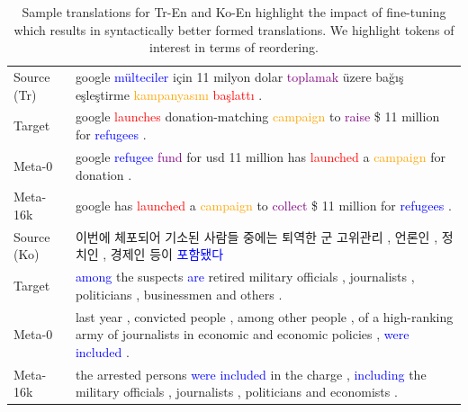 \begin{table}[tb]
\centering
\small
\begin{tabular}{p{}|p{}}
\toprule
Source (Tr) & google \textcolor{blue}{mülteciler} için 11 milyon dolar \textcolor{purple}{toplamak} üzere bağış eşleştirme \textcolor{orange}{kampanyasını} \textcolor{red}{başlattı} .\\
Target & google \textcolor{red}{launches} donation-matching \textcolor{orange}{campaign} to \textcolor{purple}{raise} \$ 11 million for \textcolor{blue}{refugees} .\\
Meta-0 & google \textcolor{blue}{refugee} \textcolor{purple}{fund} for usd 11 million has \textcolor{red}{launched} a \textcolor{orange}{campaign} for donation .\\
Meta-16k & google has \textcolor{red}{launched} a \textcolor{orange}{campaign} to \textcolor{purple}{collect} \$ 11 million for \textcolor{blue}{refugees} . \\
\midrule
Source (Ko) & 이번에 체포되어 기소된 사람들 중에는 퇴역한 군 고위관리 , 언론인 , 정치인 , 경제인 등이 \textcolor{blue}{포함됐다} \\
Target & \textcolor{blue}{among} the suspects \textcolor{blue}{are} retired military officials , journalists , politicians , businessmen and others .\\
Meta-0 & last year , convicted people , among other people , of a high-ranking army of journalists in economic and economic policies , \textcolor{blue}{were included} . \\
Meta-16k & the arrested persons \textcolor{blue}{were included} in the charge , \textcolor{blue}{including} the military officials , journalists , politicians and economists .\\
\bottomrule
\end{tabular}
\caption{\label{table:example}
Sample translations for Tr-En and Ko-En highlight the impact of fine-tuning which results in syntactically better formed translations. We highlight tokens of interest in terms of reordering.
}
\end{table}



